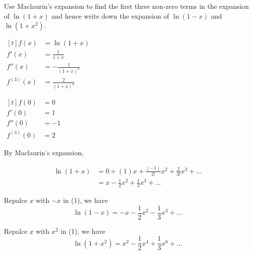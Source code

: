 \documentclass[11pt,a4paper]{book}
\begin{document}
\begin{example}

Use Maclaurin's expansion to find the first three non-zero
terms in the expansion of $\ln\left(1+x\right)$ and hence write down
the expansion of $\ln\left(1-x\right)$ and $\ln\left(1+x^{2}\right)$.

\Solution

\begin{minipage}[t]{0.4\textwidth}

$
\begin{aligned}[t]
f\left(x\right) & =\ln\left(1+x\right)\\
f'\left(x\right) & =\frac{1}{1+x}\\
f''\left(x\right) & =-\frac{1}{\left(1+x\right)^{2}}\\
f^{\left(3\right)}\left(x\right) & =\frac{2}{\left(1+x\right)^{3}}
\end{aligned}
$

\end{minipage}
\vline\hfill
\begin{minipage}[t]{0.5\textwidth}

$
\begin{aligned}[t]
f\left(0\right) & =0\\
f'\left(0\right) & =1\\
f''\left(0\right) & =-1\\
f^{\left(3\right)}\left(0\right) & =2
\end{aligned}
$

\end{minipage}

\medskip

By Maclaurin's expansion,

\begin{align*}
\ln\left(1+x\right) & =0+\left(1\right)x+\frac{\left(-1\right)}{2!}x^{2}+\frac{2}{3!}x^{3}+\ldots\\
 & =x-\frac{1}{2}x^{2}+\frac{1}{3}x^{3}+\ldots\tag{1}
\end{align*}

Repalce $x$ with $-x$ in (1), we have
\[
\ln\left(1-x\right)=-x-\frac{1}{2}x^{2}-\frac{1}{3}x^{3}+\ldots
\]

Repalce $x$ with $x^{2}$ in (1), we have
\[
\ln\left(1+x^{2}\right)=x^{2}-\frac{1}{2}x^{4}+\frac{1}{3}x^{6}+\ldots
\]

\end{example}
\end{document}
